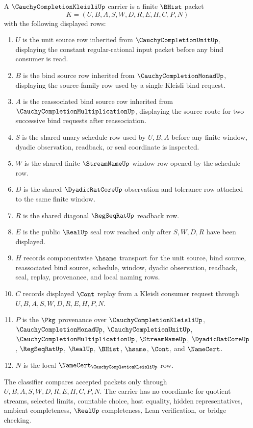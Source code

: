\begin{definition}
\label{def:cauchy-completion-kleisli-carrier}
A $\CauchyCompletionKleisliUp$ carrier is a finite $\BHist$ packet
$$
K=(U,B,A,S,W,D,R,E,H,C,P,N)
$$
with the following displayed rows:
\begin{enumerate}
\item $U$ is the unit source row inherited from $\CauchyCompletionUnitUp$, displaying the constant regular-rational input packet before any bind consumer is read.
\item $B$ is the bind source row inherited from $\CauchyCompletionMonadUp$, displaying the source-family row used by a single Kleisli bind request.
\item $A$ is the reassociated bind source row inherited from $\CauchyCompletionMultiplicationUp$, displaying the source route for two successive bind requests after reassociation.
\item $S$ is the shared unary schedule row used by $U,B,A$ before any finite window, dyadic observation, readback, or seal coordinate is inspected.
\item $W$ is the shared finite $\StreamNameUp$ window row opened by the schedule row.
\item $D$ is the shared $\DyadicRatCoreUp$ observation and tolerance row attached to the same finite window.
\item $R$ is the shared diagonal $\RegSeqRatUp$ readback row.
\item $E$ is the public $\RealUp$ seal row reached only after $S,W,D,R$ have been displayed.
\item $H$ records componentwise $\hsame$ transport for the unit source, bind source, reassociated bind source, schedule, window, dyadic observation, readback, seal, replay, provenance, and local naming rows.
\item $C$ records displayed $\Cont$ replay from a Kleisli consumer request through $U,B,A,S,W,D,R,E,H,P,N$.
\item $P$ is the $\Pkg$ provenance over $\CauchyCompletionKleisliUp$, $\CauchyCompletionMonadUp$, $\CauchyCompletionUnitUp$, $\CauchyCompletionMultiplicationUp$, $\StreamNameUp$, $\DyadicRatCoreUp$, $\RegSeqRatUp$, $\RealUp$, $\BHist$, $\hsame$, $\Cont$, and $\NameCert$.
\item $N$ is the local $\NameCert_{\CauchyCompletionKleisliUp}$ row.
\end{enumerate}
The classifier compares accepted packets only through $U,B,A,S,W,D,R,E,H,C,P,N$. The carrier has no coordinate for quotient streams, selected limits, countable choice, host equality, hidden representatives, ambient completeness, $\RealUp$ completeness, Lean verification, or bridge checking.
\end{definition}

